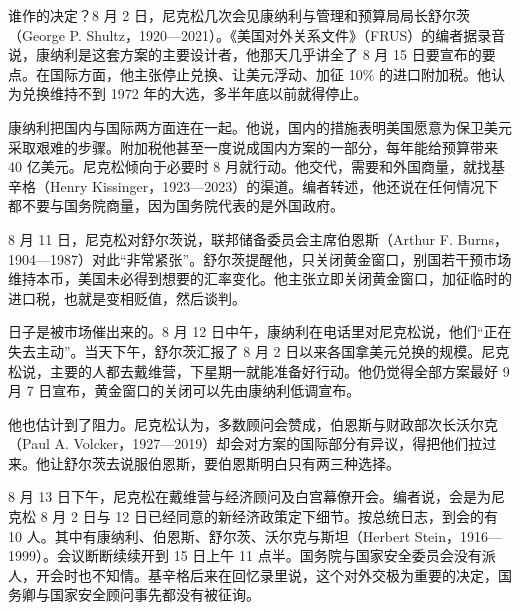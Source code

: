 谁作的决定？8 月 2 日，尼克松几次会见康纳利与管理和预算局局长舒尔茨（George P. Shultz，1920—2021）\cite{frus46a,loc46}。《美国对外关系文件》（FRUS）的编者据录音说，康纳利是这套方案的主要设计者，他那天几乎讲全了 8 月 15 日要宣布的要点\cite{frus46a}。在国际方面，他主张停止兑换、让美元浮动、加征 10\% 的进口附加税\cite{frus46a}。他认为兑换维持不到 1972 年的大选，多半年底以前就得停止\cite{frus46a}。

康纳利把国内与国际两方面连在一起。他说，国内的措施表明美国愿意为保卫美元采取艰难的步骤\cite{frus46a}。附加税他甚至一度说成国内方案的一部分，每年能给预算带来 40 亿美元\cite{frus46a}。尼克松倾向于必要时 8 月就行动\cite{frus46a}。他交代，需要和外国商量，就找基辛格（Henry Kissinger，1923—2023）的渠道\cite{frus46a,loc46}。编者转述，他还说在任何情况下都不要与国务院商量，因为国务院代表的是外国政府\cite{frus46a}。

8 月 11 日，尼克松对舒尔茨说，联邦储备委员会主席伯恩斯（Arthur F. Burns，1904—1987）对此“非常紧张”\cite{frus46a,loc46}。舒尔茨提醒他，只关闭黄金窗口，别国若干预市场维持本币，美国未必得到想要的汇率变化\cite{frus46a}。他主张立即关闭黄金窗口，加征临时的进口税，也就是变相贬值，然后谈判\cite{frus46a}。

日子是被市场催出来的。8 月 12 日中午，康纳利在电话里对尼克松说，他们“正在失去主动”\cite{frus46a}。当天下午，舒尔茨汇报了 8 月 2 日以来各国拿美元兑换的规模\cite{frus46a}。尼克松说，主要的人都去戴维营，下星期一就能准备好行动\cite{frus46a}。他仍觉得全部方案最好 9 月 7 日宣布，黄金窗口的关闭可以先由康纳利低调宣布\cite{frus46a}。

他也估计到了阻力。尼克松认为，多数顾问会赞成，伯恩斯与财政部次长沃尔克（Paul A. Volcker，1927—2019）却会对方案的国际部分有异议，得把他们拉过来\cite{frus46a,loc46}。他让舒尔茨去说服伯恩斯，要伯恩斯明白只有两三种选择\cite{frus46a}。

8 月 13 日下午，尼克松在戴维营与经济顾问及白宫幕僚开会\cite{frus46a}。编者说，会是为尼克松 8 月 2 日与 12 日已经同意的新经济政策定下细节\cite{frus46a}。按总统日志，到会的有 10 人\cite{frus46a}。其中有康纳利、伯恩斯、舒尔茨、沃尔克与斯坦（Herbert Stein，1916—1999）\cite{frus46a,loc46}。会议断断续续开到 15 日上午 11 点半\cite{frus46a}。国务院与国家安全委员会没有派人，开会时也不知情\cite{frus46a}。基辛格后来在回忆录里说，这个对外交极为重要的决定，国务卿与国家安全顾问事先都没有被征询\cite{frus46a}。

